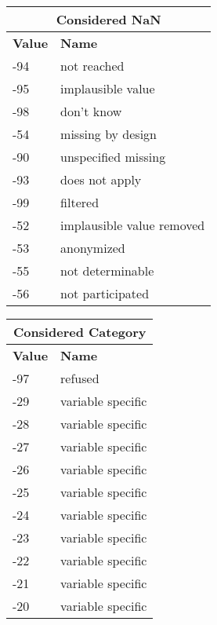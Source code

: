 \begin{table} %
    \centering
    \label{tab:missing_value_treatment}
    \begin{minipage}{.5\textwidth} %
        \centering
        \begin{tabular}{l| l}
            \multicolumn{2}{c}{Considered NaN}\\
            \hline
            \textbf{Value} & \textbf{Name}\\
            \hline
            -94 & not reached \\ 
            -95 & implausible value \\ 
            -98 & don't know \\ 
            -54 & missing by design \\ 
            -90 & unspecified missing \\ 
            -93 & does not apply \\ 
            -99 & filtered \\ 
            -52 & implausible value removed \\ 
            -53 & anonymized \\ 
            -55 & not determinable \\ 
            -56 & not participated     
        \end{tabular}
    \end{minipage}%
    \begin{minipage}{.5\textwidth} %
        \centering
        \begin{tabular}{l| l}
            \multicolumn{2}{c}{Considered Category}\\
            \hline
            \textbf{Value} & \textbf{Name}\\
            \hline
            -97 & refused\\
            -29 & variable specific \\
            -28 & variable specific \\
            -27 & variable specific \\
            -26 & variable specific \\
            -25 & variable specific \\
            -24 & variable specific \\
            -23 & variable specific \\
            -22 & variable specific \\
            -21 & variable specific \\
            -20 & variable specific \\
        \end{tabular}
    \end{minipage}
\end{table}

